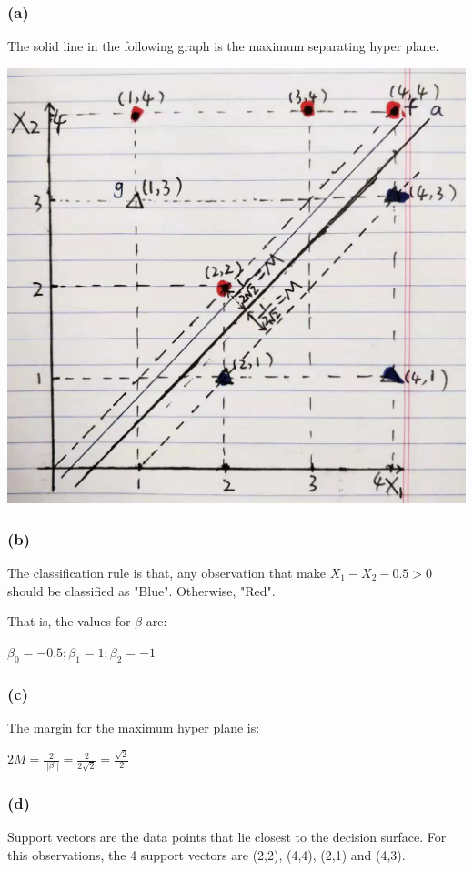 \documentclass[12pt]{article}
\begin{document}
{\subsubsection*{(a)}
The solid line in the following graph is the maximum separating hyper plane. 
\begin{center}
\includegraphics[scale=0.3]{max_margin_classifier.jpg}
\end{center}

\subsubsection*{(b)}
The classification rule is that, any observation that make $X_{1}-X_{2}-0.5 > 0$ should be classified as "Blue". Otherwise, "Red". 

That is, the values for $\beta$ are: 
\begin{center}
$\beta	_{0} = -0.5; \beta_{1} = 1; \beta_{2} = -1$
\end{center}

\subsubsection*{(c)}
The margin for the maximum hyper plane is: 

$2M=\frac{2}{|| \beta ||}=\frac{2}{2\sqrt{2}}=\frac{\sqrt{2}}{2}$

\subsubsection*{(d)}
Support vectors are the data points that lie closest to the decision surface. For this observations, the 4 support vectors are (2,2), (4,4), (2,1) and (4,3). 

}
\end{document}
